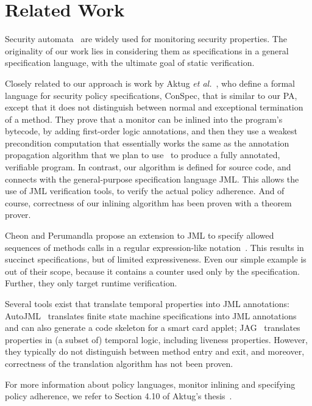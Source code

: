 \section{Related Work}\label{SecRelated}

Security automata~\cite{Schneider99} are widely used for monitoring
security properties. The originality of our work lies in considering
them as specifications in a general specification language, with the
ultimate goal of static verification.

Closely related to our approach is work by Aktug \emph{et
al.}~\cite{Aktug07,Aktug08,AktugDG08}, who define a formal language
for security policy specifications, ConSpec, that is similar to our
PA, except that it does not distinguish between normal and exceptional
termination of a method. They prove that a monitor can be inlined into
the program's bytecode, by adding first-order logic annotations, and
then they use a weakest precondition computation that essentially
works the same as the annotation propagation algorithm that we plan to
use~\cite{PavlovaBBHL03} to produce a fully annotated, verifiable
program. In contrast, our algorithm is defined for source code, and
connects with the general-purpose specification language JML. This
allows the use of JML verification tools, to verify the actual policy
adherence. And of course, correctness of our inlining algorithm has
been proven with a theorem prover.

Cheon and Perumandla propose an extension to JML to specify allowed
sequences of methods calls in a regular expression-like
notation~\cite{Cheon07}.  This results in succinct specifications, but
of limited expressiveness. Even our simple example is out of their
scope, because it contains a counter used only by the
specification. Further, they only target runtime verification.

Several tools exist that translate temporal properties into JML
annotations: AutoJML~\cite{Hubbers03} translates finite state machine
specifications into JML annotations and can also generate a code
skeleton for a smart card applet; JAG~\cite{Giorgetti06} translates
properties in (a subset of) temporal logic, including liveness
properties.  However, they typically do not distinguish between method
entry and exit, and moreover, correctness of the translation algorithm
has not been proven.

For more information about policy languages, monitor inlining and
specifying policy adherence, we refer to Section 4.10 of Aktug's
thesis~\cite{Aktug08}. 
